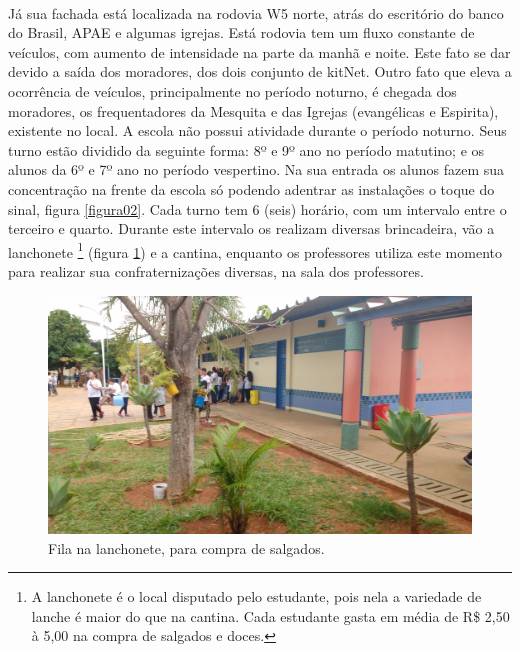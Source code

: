 \paragraph{}Já sua fachada está localizada na rodovia  W5  norte, atrás do escritório do banco do Brasil,  APAE  e  algumas  igrejas.  Está  rodovia  tem  um  fluxo  constante  de  veículos,  com aumento  de  intensidade  na  parte  da  manhã  e  noite.  Este  fato  se  dar  devido  a  saída  dos moradores,  dos  dois  conjunto  de  kitNet.  Outro  fato  que  eleva  a   ocorrência  de  veículos, principalmente  no  período  noturno,  é  chegada  dos  moradores,  os  frequentadores  da Mesquita  e  das  Igrejas  (evangélicas   e  Espirita),  existente  no  local.  A  escola  não  possui atividade  durante  o   período  noturno.  Seus  turno  estão  dividido  da  seguinte  forma:  8º  e  9º ano no período matutino; e os alunos da 6º e 7º ano no período vespertino. Na sua entrada os alunos fazem sua concentração na frente da escola só podendo adentrar as instalações o toque do sinal, figura \ref{figura02}. Cada turno tem 6 (seis) horário, com um intervalo entre o terceiro e quarto. Durante este intervalo os realizam  diversas brincadeira, vão a lanchonete \footnote{A lanchonete é o local disputado pelo estudante, pois nela a variedade de lanche é maior do que na cantina. Cada estudante gasta em média de R\$ 2,50 à 5,00 na compra de salgados e doces.} (figura \ref{figura07}) e a cantina, enquanto os professores utiliza este momento para realizar sua confraternizações diversas, na sala dos professores.  
\FloatBarrier
\begin{figure}[!htpb]
        \centering
        \includegraphics[width=.7\textwidth]{imagens/IMG_20161018_154304252.jpg}
        \caption{Fila na lanchonete, para compra de salgados.}
        \label{figura07}
\end{figure}
\FloatBarrier

